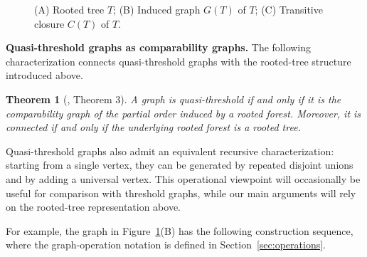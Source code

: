 \documentclass[11pt,reqno]{amsart}
\newtheorem{theorem}{Theorem}[section]
\theoremstyle{definition}
\newcommand{\circled}[1]{\tikz[baseline=(char.base)]{\node[draw, circle, inner sep=0.3pt, line width=0.4pt] (char) {\scriptsize $#1$};}}
\newcommand{\Uni}{{\mathbin{\circled{\mathcal U}}}}
\begin{document}
\begin{figure}[H]
\caption{(A) Rooted tree $T$; (B) Induced graph $G(T)$ of $T$; (C) Transitive closure $C(T)$ of $T$.}
\label{rootedtree}
\end{figure}

\noindent
\textbf{Quasi-threshold graphs as comparability graphs.}
The following characterization connects quasi-threshold graphs with
the rooted-tree structure introduced above.
\begin{theorem}[\cite{yan1996quasi}, Theorem 3]
A graph is quasi-threshold if and only if it is the comparability graph
of the partial order induced by a rooted forest. Moreover, it is connected
if and only if the underlying rooted forest is a rooted tree. \end{theorem}
Quasi-threshold graphs also admit an equivalent recursive characterization: starting from a single vertex, they can be generated by repeated disjoint unions and by adding a universal vertex. This operational viewpoint will occasionally be useful for comparison with threshold graphs, while our main arguments will rely on the rooted-tree representation above.

For example, the graph in Figure~\ref{rootedtree}(B) has the following construction sequence, where the graph-operation notation is defined in Section~\ref{sec:operations}.
\begin{figure}[H]
\centering
{}
\end{figure}
\end{document}

